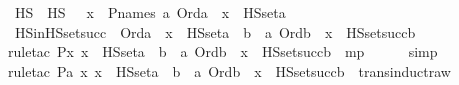\begin{isabellebody}
\isamarkupfalse%
\ HS\ \ {\isachardoublequoteopen}HS\ {\isasymequiv}\ {\isacharbraceleft}{\kern0pt}\ x\ {\isasymin}\ P{\isacharunderscore}{\kern0pt}names{\isachardot}{\kern0pt}\ {\isasymexists}a{\isachardot}{\kern0pt}\ Ord{\isacharparenleft}{\kern0pt}a{\isacharparenright}{\kern0pt}\ {\isasymand}\ x\ {\isasymin}\ HS{\isacharunderscore}{\kern0pt}set{\isacharparenleft}{\kern0pt}a{\isacharparenright}{\kern0pt}\ {\isacharbraceright}{\kern0pt}{\isachardoublequoteclose}\ \isanewline
\isanewline
{}\isamarkupfalse%
\ HS{\isacharunderscore}{\kern0pt}in{\isacharunderscore}{\kern0pt}HS{\isacharunderscore}{\kern0pt}set{\isacharunderscore}{\kern0pt}succ{\isacharprime}{\kern0pt}\ {\isacharcolon}{\kern0pt}\ {\isachardoublequoteopen}Ord{\isacharparenleft}{\kern0pt}a{\isacharparenright}{\kern0pt}\ {\isasymLongrightarrow}\ x\ {\isasymin}\ HS{\isacharunderscore}{\kern0pt}set{\isacharparenleft}{\kern0pt}a{\isacharparenright}{\kern0pt}\ {\isasymLongrightarrow}\ {\isasymexists}b\ {\isacharless}{\kern0pt}\ a{\isachardot}{\kern0pt}\ Ord{\isacharparenleft}{\kern0pt}b{\isacharparenright}{\kern0pt}\ {\isasymand}\ x\ {\isasymin}\ HS{\isacharunderscore}{\kern0pt}set{\isacharparenleft}{\kern0pt}succ{\isacharparenleft}{\kern0pt}b{\isacharparenright}{\kern0pt}{\isacharparenright}{\kern0pt}{\isachardoublequoteclose}\ \isanewline
%
\isadelimproof
\ \ %
\endisadelimproof
%
\isatagproof
{}\isamarkupfalse%
{\isacharparenleft}{\kern0pt}rule{\isacharunderscore}{\kern0pt}tac\ P{\isacharequal}{\kern0pt}{\isachardoublequoteopen}{\isasymforall}x{\isachardot}{\kern0pt}\ x\ {\isasymin}\ HS{\isacharunderscore}{\kern0pt}set{\isacharparenleft}{\kern0pt}a{\isacharparenright}{\kern0pt}\ {\isasymlongrightarrow}\ {\isacharparenleft}{\kern0pt}{\isasymexists}b\ {\isacharless}{\kern0pt}\ a{\isachardot}{\kern0pt}\ Ord{\isacharparenleft}{\kern0pt}b{\isacharparenright}{\kern0pt}\ {\isasymand}\ x\ {\isasymin}\ HS{\isacharunderscore}{\kern0pt}set{\isacharparenleft}{\kern0pt}succ{\isacharparenleft}{\kern0pt}b{\isacharparenright}{\kern0pt}{\isacharparenright}{\kern0pt}{\isacharparenright}{\kern0pt}{\isachardoublequoteclose}\ \ mp{\isacharparenright}{\kern0pt}\ \isanewline
\ \ \ \isamarkupfalse%
\ simp\ \isanewline
\ \ \isamarkupfalse%
{\isacharparenleft}{\kern0pt}rule{\isacharunderscore}{\kern0pt}tac\ P{\isacharequal}{\kern0pt}{\isachardoublequoteopen}{\isasymlambda}a{\isachardot}{\kern0pt}\ {\isasymforall}x{\isachardot}{\kern0pt}\ x\ {\isasymin}\ HS{\isacharunderscore}{\kern0pt}set{\isacharparenleft}{\kern0pt}a{\isacharparenright}{\kern0pt}\ {\isasymlongrightarrow}\ {\isacharparenleft}{\kern0pt}{\isasymexists}b\ {\isacharless}{\kern0pt}\ a{\isachardot}{\kern0pt}\ Ord{\isacharparenleft}{\kern0pt}b{\isacharparenright}{\kern0pt}\ {\isasymand}\ x\ {\isasymin}\ HS{\isacharunderscore}{\kern0pt}set{\isacharparenleft}{\kern0pt}succ{\isacharparenleft}{\kern0pt}b{\isacharparenright}{\kern0pt}{\isacharparenright}{\kern0pt}{\isacharparenright}{\kern0pt}{\isachardoublequoteclose}\ \ trans{\isacharunderscore}{\kern0pt}induct{}{\isacharunderscore}{\kern0pt}raw{\isacharparenright}{\kern0pt}\ \ \isanewline

\end{isabellebody}
